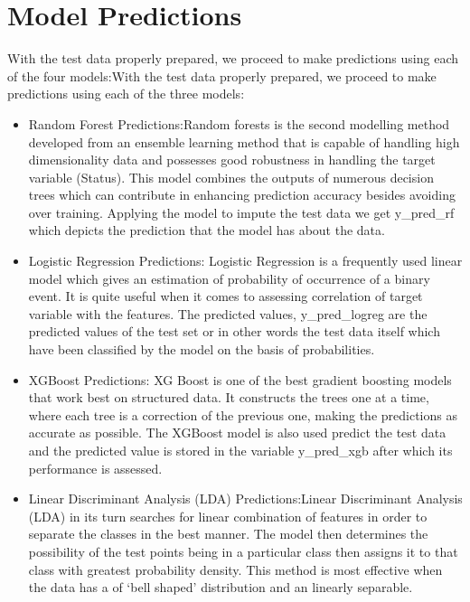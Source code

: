 \documentclass[12pt, a4paper,oneside]{book}
\numberwithin{equation}{section}
\begin{document}
\section{Model Predictions}

 With the test data properly prepared, we proceed to make predictions using each of the four models:With the test data properly prepared, we proceed to make predictions using each of the three models: 

\begin{itemize}
    \item Random Forest Predictions:Random forests is the second modelling method developed from an ensemble learning method that is capable of handling high dimensionality data and possesses good robustness in handling the target variable (Status). This model combines the outputs of numerous decision trees which can contribute in enhancing prediction accuracy besides avoiding over training. Applying the model to impute the test data we get y\_pred\_rf which depicts the prediction that the model has about the data. 
    
    \item Logistic Regression Predictions: Logistic Regression is a frequently used linear model which gives an estimation of probability of occurrence of a binary event. It is quite useful when it comes to assessing correlation of target variable with the features. The predicted values, y\_pred\_logreg are the predicted values of the test set or in other words the test data itself which have been classified by the model on the basis of probabilities. 
    
    \item XGBoost Predictions:  XG Boost is one of the best gradient boosting models that work best on structured data. It constructs the trees one at a time, where each tree is a correction of the previous one, making the predictions as accurate as possible. The XGBoost model is also used predict the test data and the predicted value is stored in the variable y\_pred\_xgb after which its performance is assessed. 

   \item Linear Discriminant Analysis (LDA) Predictions:Linear Discriminant Analysis (LDA) in its turn searches for linear combination of features in order to separate the classes in the best manner. The model then determines the possibility of the test points being in a particular class then assigns it to that class with greatest probability density. This method is most effective when the data has a of ‘bell shaped’ distribution and an linearly separable.
\end{itemize}
\end{document}
